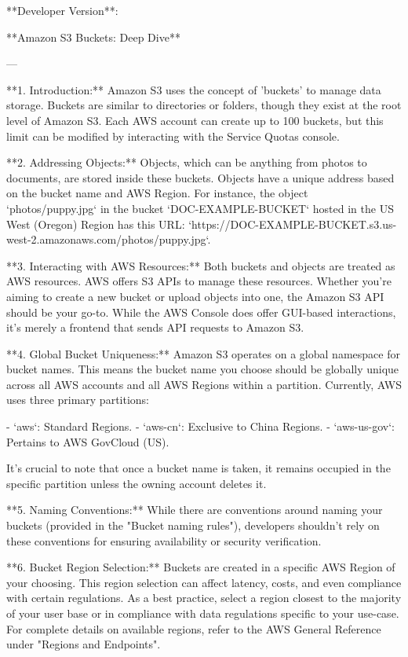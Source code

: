 **Developer Version**:

**Amazon S3 Buckets: Deep Dive**

---

**1. Introduction:**
Amazon S3 uses the concept of 'buckets' to manage data storage. Buckets are similar to directories or folders, though they exist at the root level of Amazon S3. Each AWS account can create up to 100 buckets, but this limit can be modified by interacting with the Service Quotas console.

**2. Addressing Objects:**
Objects, which can be anything from photos to documents, are stored inside these buckets. Objects have a unique address based on the bucket name and AWS Region. For instance, the object `photos/puppy.jpg` in the bucket `DOC-EXAMPLE-BUCKET` hosted in the US West (Oregon) Region has this URL:  
`https://DOC-EXAMPLE-BUCKET.s3.us-west-2.amazonaws.com/photos/puppy.jpg`.

**3. Interacting with AWS Resources:**
Both buckets and objects are treated as AWS resources. AWS offers S3 APIs to manage these resources. Whether you're aiming to create a new bucket or upload objects into one, the Amazon S3 API should be your go-to. While the AWS Console does offer GUI-based interactions, it's merely a frontend that sends API requests to Amazon S3.

**4. Global Bucket Uniqueness:**
Amazon S3 operates on a global namespace for bucket names. This means the bucket name you choose should be globally unique across all AWS accounts and all AWS Regions within a partition. Currently, AWS uses three primary partitions:

- `aws`: Standard Regions.
- `aws-cn`: Exclusive to China Regions.
- `aws-us-gov`: Pertains to AWS GovCloud (US).

It's crucial to note that once a bucket name is taken, it remains occupied in the specific partition unless the owning account deletes it.

**5. Naming Conventions:**
While there are conventions around naming your buckets (provided in the "Bucket naming rules"), developers shouldn't rely on these conventions for ensuring availability or security verification.

**6. Bucket Region Selection:**
Buckets are created in a specific AWS Region of your choosing. This region selection can affect latency, costs, and even compliance with certain regulations. As a best practice, select a region closest to the majority of your user base or in compliance with data regulations specific to your use-case. For complete details on available regions, refer to the AWS General Reference under "Regions and Endpoints".


